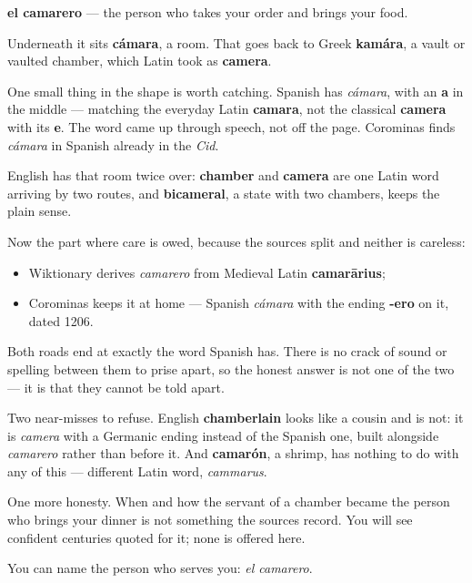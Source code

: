 \begin{cousinweb}
\textbf{el camarero} — the person who takes your order and brings your food.

Underneath it sits \textbf{cámara}, a room. That goes back to Greek \textbf{kamára}, a vault or vaulted chamber, which Latin took as \textbf{camera}.

One small thing in the shape is worth catching. Spanish has \emph{cámara}, with an \textbf{a} in the middle — matching the everyday Latin \textbf{camara}, not the classical \textbf{camera} with its \textbf{e}. The word came up through speech, not off the page. Corominas finds \emph{cámara} in Spanish already in the \emph{Cid}.

English has that room twice over: \textbf{chamber} and \textbf{camera} are one Latin word arriving by two routes, and \textbf{bicameral}, a state with two chambers, keeps the plain sense.

Now the part where care is owed, because the sources split and neither is careless:

\begin{itemize}
\raggedright
  \item Wiktionary derives \emph{camarero} from Medieval Latin \textbf{camarārius};
  \item Corominas keeps it at home — Spanish \emph{cámara} with the ending \textbf{-ero} on it, dated 1206.
\end{itemize}

Both roads end at exactly the word Spanish has. There is no crack of sound or spelling between them to prise apart, so the honest answer is not one of the two — it is that they cannot be told apart.

Two near-misses to refuse. English \textbf{chamberlain} looks like a cousin and is not: it is \emph{camera} with a Germanic ending instead of the Spanish one, built alongside \emph{camarero} rather than before it. And \textbf{camarón}, a shrimp, has nothing to do with any of this — different Latin word, \emph{cammarus}.

One more honesty. When and how the servant of a chamber became the person who brings your dinner is not something the sources record. You will see confident centuries quoted for it; none is offered here.
\end{cousinweb}

\begin{grammarlens}[title={What you've built}]
You can name the person who serves you: \emph{el camarero}.
\end{grammarlens}


